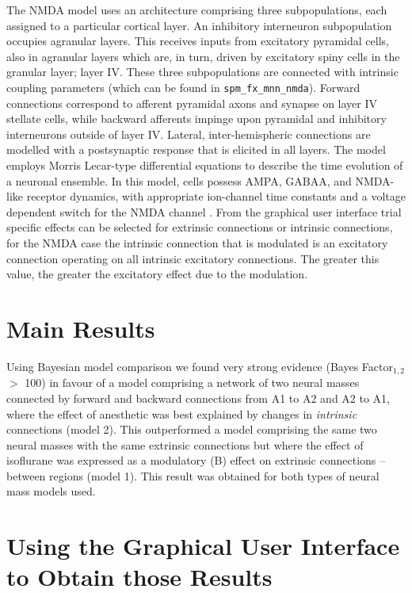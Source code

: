 The NMDA model uses an architecture comprising three subpopulations, each assigned to a particular cortical layer. An inhibitory interneuron subpopulation occupies agranular layers. This receives inputs from excitatory pyramidal cells, also in agranular layers which are, in turn, driven by excitatory spiny cells in the granular layer; layer IV. These three subpopulations are connected with intrinsic coupling parameters (which can be found in \texttt{spm\_fx\_mnn\_nmda}). Forward connections correspond to afferent pyramidal axons and synapse on layer IV stellate cells, while backward afferents impinge upon pyramidal and inhibitory interneurons outside of layer IV. Lateral, inter-hemispheric connections are modelled with a postsynaptic response that is elicited in all layers. The model employs Morris Lecar-type differential equations to describe the time evolution of a neuronal ensemble.  In this model, cells possess AMPA, GABAA, and NMDA-like receptor dynamics, with appropriate ion-channel time constants and a voltage dependent switch for the NMDA channel \cite{Moran2011}. From the graphical user interface trial specific effects can be selected for extrinsic connections or intrinsic connections, for the NMDA case the intrinsic connection that is modulated is an excitatory connection operating on all intrinsic excitatory connections. The greater this value, the greater the excitatory effect due to the modulation.

\section{Main Results}

Using Bayesian model comparison we found very strong evidence (Bayes Factor$_{1,2}$ $>$ 100) in favour of a model comprising a network of two neural masses connected by forward and backward connections from A1 to A2 and A2 to A1, where the effect of anesthetic was best explained by changes in \emph{intrinsic} connections (model 2). This outperformed a model comprising the same two neural masses with the same extrinsic connections but where the effect of isoflurane was expressed as a modulatory (B) effect on extrinsic connections – between regions (model 1).  This result was obtained for both types of neural mass models used.

\section{Using the Graphical User Interface to Obtain those Results}

